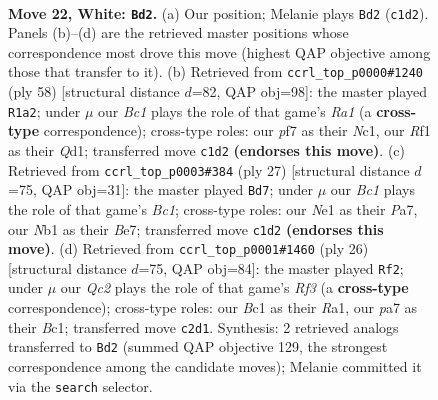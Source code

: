 \documentclass[11pt]{article}
\begin{document}
\clearpage

\begin{figure}[p]\centering
\begin{subfigure}{0.46\textwidth}\centering
\resizebox{\linewidth}{!}{%
\newchessgame
\chessboard[
  setfen={nrbr2k1/p3qpb1/7p/2p1pn1P/1p6/3PPB2/PPQ2P2/RNB1NRK1 w - - 0 22},
  showmover=false,
  pgfstyle=straightmove, color=movearrow, markmove={c1-d2}
]}
\caption{}
\end{subfigure}\hfill
\begin{subfigure}{0.46\textwidth}\centering
\resizebox{\linewidth}{!}{%
\newchessgame
\chessboard[
  setfen={r5k1/1rq2pb1/3p1n1p/pbpPn1p1/4P3/RP2B1PP/3N1PB1/R1NQ2K1 w - - 12 30},
  showmover=false,
  pgfstyle=straightmove, color=movearrow, markmove={a1-a2}
]}
\caption{}
\end{subfigure}
\\[4pt]
\begin{subfigure}{0.46\textwidth}\centering
\resizebox{\linewidth}{!}{%
\newchessgame
\chessboard[
  setfen={r1b1k2r/pp2bppp/1q2p3/2npP3/8/P4N2/1PB2PPP/R1BQR1K1 b kq - 4 14},
  showmover=false,
  pgfstyle=straightmove, color=movearrow, markmove={c8-d7}
]}
\caption{}
\end{subfigure}\hfill
\begin{subfigure}{0.46\textwidth}\centering
\resizebox{\linewidth}{!}{%
\newchessgame
\chessboard[
  setfen={r1bq1rk1/ppp1n2p/3p1bp1/5p1n/2PP4/2N1PRPB/PP4NP/R1BQ2K1 w - - 1 14},
  showmover=false,
  pgfstyle=straightmove, color=movearrow, markmove={f3-f2}
]}
\caption{}
\end{subfigure}
\caption{\textbf{Move 22, White: \texttt{Bd2}.} (a) Our position; Melanie plays \texttt{Bd2} (\texttt{c1d2}). Panels (b)--(d) are the retrieved master positions whose correspondence most drove this move (highest QAP objective among those that transfer to it). (b) Retrieved from \texttt{ccrl\_top\_p0000\#1240} (ply 58) [structural distance $d$=82, QAP obj=98]: the master played \texttt{R1a2}; under $\mu$ our \emph{Bc1} plays the role of that game's \emph{Ra1} (a \textbf{cross-type} correspondence); cross-type roles: our \emph{p}f7 as their \emph{N}c1, our \emph{R}f1 as their \emph{Q}d1; transferred move \texttt{c1d2} \textbf{(endorses this move)}. (c) Retrieved from \texttt{ccrl\_top\_p0003\#384} (ply 27) [structural distance $d$=75, QAP obj=31]: the master played \texttt{Bd7}; under $\mu$ our \emph{Bc1} plays the role of that game's \emph{Bc1}; cross-type roles: our \emph{N}e1 as their \emph{P}a7, our \emph{N}b1 as their \emph{B}e7; transferred move \texttt{c1d2} \textbf{(endorses this move)}. (d) Retrieved from \texttt{ccrl\_top\_p0001\#1460} (ply 26) [structural distance $d$=75, QAP obj=84]: the master played \texttt{Rf2}; under $\mu$ our \emph{Qc2} plays the role of that game's \emph{Rf3} (a \textbf{cross-type} correspondence); cross-type roles: our \emph{B}c1 as their \emph{R}a1, our \emph{p}a7 as their \emph{B}c1; transferred move \texttt{c2d1}. Synthesis: 2 retrieved analogs transferred to \texttt{Bd2} (summed QAP objective 129, the strongest correspondence among the candidate moves); Melanie committed it via the \texttt{search} selector.}
\label{fig:thought-m42}
\end{figure}
\end{document}
